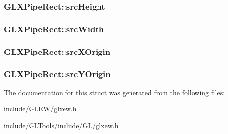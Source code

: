 \hypertarget{struct_g_l_x_pipe_rect_a35632524bce6bffa05f284a9b1c1b8ff}{
\subsubsection[{src\-Height}]{ G\-L\-X\-Pipe\-Rect\-::src\-Height}}\label{struct_g_l_x_pipe_rect_a35632524bce6bffa05f284a9b1c1b8ff}
\hypertarget{struct_g_l_x_pipe_rect_a2c6c180a4dabb71076366e06a1c7d0ef}{
\subsubsection[{src\-Width}]{ G\-L\-X\-Pipe\-Rect\-::src\-Width}}\label{struct_g_l_x_pipe_rect_a2c6c180a4dabb71076366e06a1c7d0ef}
\hypertarget{struct_g_l_x_pipe_rect_a9df2313c01f75d149e64f2ff467bc266}{
\subsubsection[{src\-X\-Origin}]{ G\-L\-X\-Pipe\-Rect\-::src\-X\-Origin}}\label{struct_g_l_x_pipe_rect_a9df2313c01f75d149e64f2ff467bc266}
\hypertarget{struct_g_l_x_pipe_rect_a1f7316dff7050ab2ce9d3d37f8c5450e}{
\subsubsection[{src\-Y\-Origin}]{ G\-L\-X\-Pipe\-Rect\-::src\-Y\-Origin}}\label{struct_g_l_x_pipe_rect_a1f7316dff7050ab2ce9d3d37f8c5450e}


The documentation for this struct was generated from the following files\-:\begin{DoxyCompactItemize}
\item 
include/\-G\-L\-E\-W/\hyperlink{_g_l_e_w_2glxew_8h}{glxew.\-h}\item 
include/\-G\-L\-Tools/include/\-G\-L/\hyperlink{_g_l_tools_2include_2_g_l_2glxew_8h}{glxew.\-h}\end{DoxyCompactItemize}
